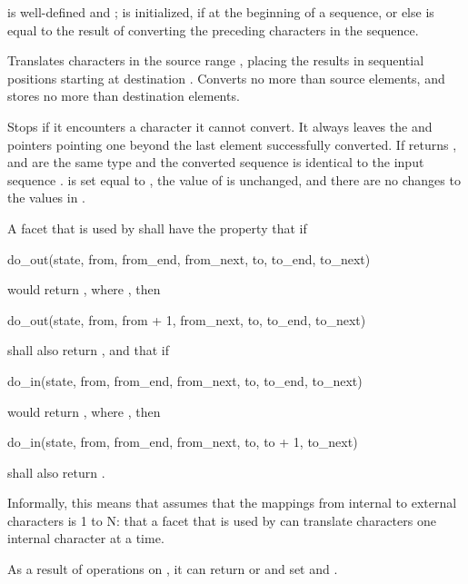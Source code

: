 \begin{itemdescr}
\pnum
\expects
{} is well-defined and ;
 is initialized, if at the beginning of a sequence,
or else is equal to the result of converting
the preceding characters in the sequence.

\pnum
\effects
Translates characters in the source range ,
placing the results in sequential positions starting at destination .
Converts no more than  source elements, and
stores no more than  destination elements.

\pnum
Stops if it encounters a character it cannot convert.
It always leaves the  and  pointers
pointing one beyond the last element successfully converted.
If returns ,
 and  are the same type and
the converted sequence is identical to
the input sequence .
 is set equal to ,
the value of  is unchanged, and
there are no changes to the values in .

\pnum
A  facet
that is used by 
shall have the property that if
\begin{codeblock}
do_out(state, from, from_end, from_next, to, to_end, to_next)
\end{codeblock}
would return ,
where ,
then
\begin{codeblock}
do_out(state, from, from + 1, from_next, to, to_end, to_next)
\end{codeblock}
shall also return ,
and that if
\begin{codeblock}
do_in(state, from, from_end, from_next, to, to_end, to_next)
\end{codeblock}
would return ,
where ,
then
\begin{codeblock}
do_in(state, from, from_end, from_next, to, to + 1, to_next)
\end{codeblock}
shall also return .
\begin{footnote}
Informally, this means that 
assumes that the mappings from internal to external characters is 1 to N:
that a  facet that is used by 
can translate characters one internal character at a time.
\end{footnote}
\begin{note}
As a result of operations on ,
it can return  or  and
set  and .
\end{note}


\end{itemdescr}
